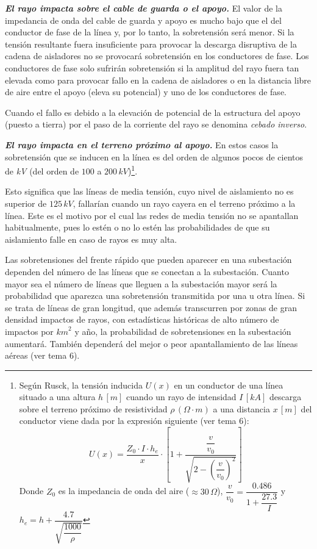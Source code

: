             \textbf{\textit{El rayo impacta sobre el cable de guarda o el apoyo.}} El valor de la impedancia de onda del cable de guarda y apoyo es mucho bajo que el del conductor de fase de la línea y, por lo tanto, la sobretensión será menor. Si la tensión resultante fuera insuficiente para provocar la descarga disruptiva de la cadena de aisladores no se provocará sobretensión en los conductores de fase. Los conductores de fase solo sufrirán sobretensión si la amplitud del rayo fuera tan elevada como para provocar fallo en la cadena de aisladores o en la distancia libre de aire entre el apoyo (eleva su potencial) y uno de los conductores de fase.\newline
            
            Cuando el fallo es debido a la elevación de potencial de la estructura del apoyo (puesto a tierra) por el paso de la corriente del rayo se denomina \textit{cebado inverso}.\newline
            
            \textbf{\textit{El rayo impacta en el terreno próximo al apoyo.}} En estos casos la sobretensión que se inducen en la línea es del orden de algunos pocos de cientos de \textit{kV} (del orden de $100$ a $200\,\textit{kV}$)\footnote{Según Rusck, la tensión inducida $U(x)$ en un conductor de una línea situado a una altura $h\,[\textit{m}]$ cuando un rayo de intensidad $I\,[kA]$ descarga sobre el terreno próximo de resistividad $\rho\,(\Omega\cdot\textit{m})$ a una distancia $x\,[\textit{m}]$ del conductor viene dada por la expresión siguiente (ver tema 6): $$U(x) = \dfrac{Z_0\cdot I\cdot h_e}{x}\cdot \left[1+\dfrac{\dfrac{v}{v_0}}{\sqrt{2-\left(\dfrac{v}{v_0}\right)^2}}\right]$$ Donde $Z_0$ es la impedancia de onda del aire ($\approx 30\,\Omega$), $\dfrac{v}{v_0} = \dfrac{0.486}{1+\dfrac{27.3}{I}}$ y $h_e = h + \dfrac{4.7}{\sqrt{\dfrac{1000}{\rho}}}$}.\newline

            Esto significa que las líneas de media tensión, cuyo nivel de aislamiento no es superior de $125\,\textit{kV}$, fallarían cuando un rayo cayera en el terreno próximo a la línea. Este es el motivo por el cual las redes de media tensión no se apantallan habitualmente, pues lo estén o no lo estén las probabilidades de que su aislamiento falle en caso de rayos es muy alta.\newline
            
            Las sobretensiones del frente rápido que pueden aparecer en una subestación dependen del número de las líneas que se conectan a la subestación. Cuanto mayor sea el número de líneas que lleguen a la subestación mayor será la probabilidad que aparezca una sobretensión transmitida por una u otra línea. Si se trata de líneas de gran longitud, que además transcurren por zonas de gran densidad impactos de rayos, con estadísticas históricas de alto número de impactos por $\textit{km}^2$ y año, la probabilidad de sobretensiones en la subestación aumentará. También dependerá del mejor o peor apantallamiento de las líneas aéreas (ver tema 6).\newline
            
